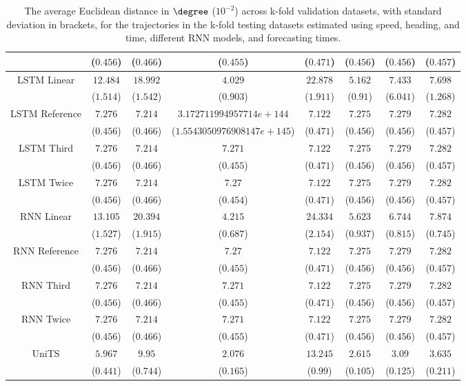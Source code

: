 \begin{table}[!ht]
{\begin{tabular}{|c|c|c|c|c|c|c|c|}
			 & ($0.456$) & ($0.466$) & ($0.455$) & ($0.471$) & ($0.456$) & ($0.456$) & ($0.457$) \\ \hline
			\multirow{2}{*}{LSTM Linear} & $12.484$ & $18.992$ & $4.029$ & $22.878$ & $5.162$ & $7.433$ & $7.698$ \\
			 & ($1.514$) & ($1.542$) & ($0.903$) & ($1.911$) & ($0.91$) & ($6.041$) & ($1.268$) \\ \hline
			\multirow{2}{*}{LSTM Reference} & $7.276$ & $7.214$ & $3.172711994957714e+144$ & $7.122$ & $7.275$ & $7.279$ & $7.282$ \\
			 & ($0.456$) & ($0.466$) & ($1.5543050976908147e+145$) & ($0.471$) & ($0.456$) & ($0.456$) & ($0.457$) \\ \hline
			\multirow{2}{*}{LSTM Third} & $7.276$ & $7.214$ & $7.271$ & $7.122$ & $7.275$ & $7.279$ & $7.282$ \\
			 & ($0.456$) & ($0.466$) & ($0.455$) & ($0.471$) & ($0.456$) & ($0.456$) & ($0.457$) \\ \hline
			\multirow{2}{*}{LSTM Twice} & $7.276$ & $7.214$ & $7.27$ & $7.122$ & $7.275$ & $7.279$ & $7.282$ \\
			 & ($0.456$) & ($0.466$) & ($0.454$) & ($0.471$) & ($0.456$) & ($0.456$) & ($0.457$) \\ \hline
			\multirow{2}{*}{RNN Linear} & $13.105$ & $20.394$ & $4.215$ & $24.334$ & $5.623$ & $6.744$ & $7.874$ \\
			 & ($1.527$) & ($1.915$) & ($0.687$) & ($2.154$) & ($0.937$) & ($0.815$) & ($0.745$) \\ \hline
			\multirow{2}{*}{RNN Reference} & $7.276$ & $7.214$ & $7.27$ & $7.122$ & $7.275$ & $7.279$ & $7.282$ \\
			 & ($0.456$) & ($0.466$) & ($0.455$) & ($0.471$) & ($0.456$) & ($0.456$) & ($0.457$) \\ \hline
			\multirow{2}{*}{RNN Third} & $7.276$ & $7.214$ & $7.271$ & $7.122$ & $7.275$ & $7.279$ & $7.282$ \\
			 & ($0.456$) & ($0.466$) & ($0.455$) & ($0.471$) & ($0.456$) & ($0.456$) & ($0.457$) \\ \hline
			\multirow{2}{*}{RNN Twice} & $7.276$ & $7.214$ & $7.271$ & $7.122$ & $7.275$ & $7.279$ & $7.282$ \\
			 & ($0.456$) & ($0.466$) & ($0.455$) & ($0.471$) & ($0.456$) & ($0.456$) & ($0.457$) \\ \hline
			\multirow{2}{*}{UniTS} & $5.967$ & $9.95$ & $2.076$ & $13.245$ & $2.615$ & $3.09$ & $3.635$ \\
			 & ($0.441$) & ($0.744$) & ($0.165$) & ($0.99$) & ($0.105$) & ($0.125$) & ($0.211$) \\ \hline
		\end{tabular}
	}
	\caption{The average Euclidean distance in $\degree$ ($10^{-2}$) across k-fold validation datasets, with standard deviation in brackets, for the trajectories in the k-fold testing datasets estimated using speed, heading, and time, different RNN models, and forecasting times.}
	\label{tab:all_speed_actual_dir_euclid}
\end{table}


